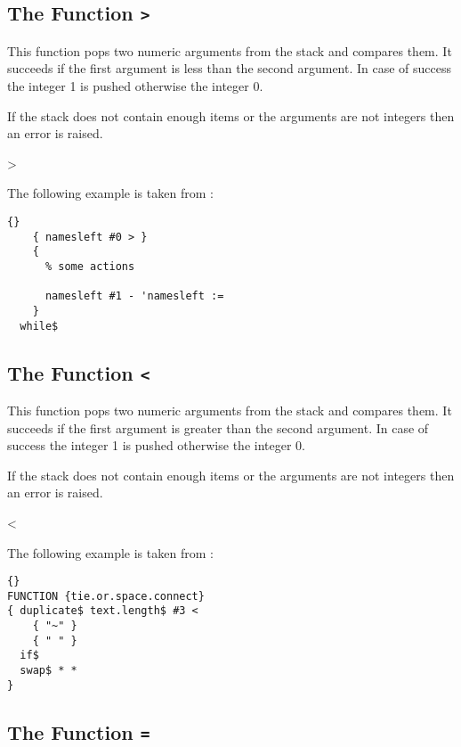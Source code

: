 \subsection{The Function \texttt{>}}%
\fctIndex{>}

This function pops two numeric arguments from the stack and
compares them. It succeeds if the first argument is less than the
second argument. In case of success the integer 1 is pushed otherwise
the integer 0.

If the stack does not contain enough items or the arguments are not
integers then an error is raised.

\begin{BstFunction}{>}
\end{BstFunction}

The following example is taken from :

\begin{lstlisting}{}
    { namesleft #0 > }
    { 
      % some actions

      namesleft #1 - 'namesleft :=
    }
  while$
\end{lstlisting}


\subsection{The Function \texttt{<}}%
\fctIndex{<}

This function pops two numeric arguments from the stack and
compares them. It succeeds if the first argument is greater than the
second argument. In case of success the integer 1 is pushed otherwise
the integer 0.

If the stack does not contain enough items or the arguments are not
integers then an error is raised.

\begin{BstFunction}{<}
\end{BstFunction}

The following example is taken from :

\begin{lstlisting}{}
FUNCTION {tie.or.space.connect}
{ duplicate$ text.length$ #3 <
    { "~" }
    { " " }
  if$
  swap$ * *
}
\end{lstlisting}\fctIndex{<}\fctIndex{*}%


\subsection{The Function \texttt{=}}%
\fctIndex{=}

